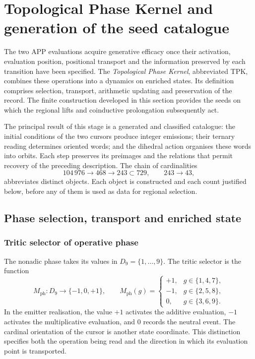 \section{Topological Phase Kernel and generation of the seed catalogue}
\label{act21:tpk:capitulo}

The two APP evaluations acquire generative efficacy once their activation,
evaluation position, positional transport and the information preserved by
each transition have been specified. The \emph{Topological Phase Kernel},
abbreviated TPK, combines these operations into a dynamics on enriched
states. Its definition comprises selection, transport, arithmetic updating
and preservation of the record. The finite construction developed in this
section provides the seeds on which the regional lifts and coinductive
prolongation subsequently act.

The principal result of this stage is a generated and classified catalogue:
the initial conditions of the two cursors produce integer emissions;
their ternary reading determines oriented words; and the dihedral action
organises these words into orbits. Each step preserves its preimages and
the relations that permit recovery of the preceding description. The chain
of cardinalities
\[
 104\,976\longrightarrow468\longrightarrow243\subset729,
 \qquad 243\longrightarrow43,
\]
abbreviates distinct objects. Each object is constructed and each count
justified below, before any of them is used as data for regional selection.

\subsection{Phase selection, transport and enriched state}
\label{act21:tpk:operaciones}

\subsubsection{Tritic selector of operative phase}

The nonadic phase takes its values in \(D_9=\{1,\ldots,9\}\). The tritic
selector is the function
\begin{equation}
 M_{\mathrm{ph}}:D_9\longrightarrow\{-1,0,+1\},\qquad
 M_{\mathrm{ph}}(g)=
 \begin{cases}
 +1,&g\in\{1,4,7\},\\
 -1,&g\in\{2,5,8\},\\
 0,&g\in\{3,6,9\}.
 \end{cases}
 \label{act21:tpk:selector}
\end{equation}
In the emitter realisation, the value \(+1\) activates the additive
evaluation, \(-1\) activates the multiplicative evaluation, and \(0\)
records the neutral event. The cardinal orientation of the cursor is
another state coordinate. This distinction specifies both the operation
being read and the direction in which its evaluation point is transported.

